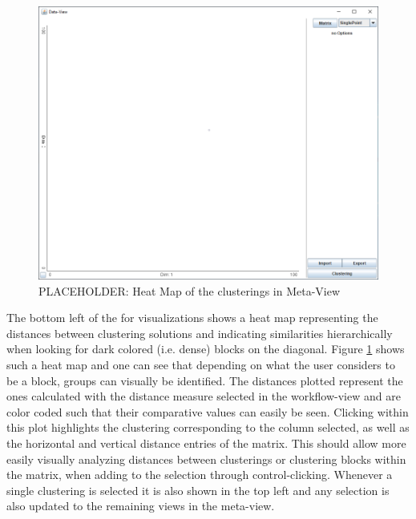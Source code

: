 \documentclass[
	a4paper,
	english,
	twoside,
	openright,               
	11pt                            
	]{report}
\begin{document}
\begin{figure}[h]
	\centering
	\includegraphics[scale=.45]{data-view}
	\caption{PLACEHOLDER: Heat Map of the clusterings in Meta-View}
	\label{fig:heatmap}
\end{figure}

The bottom left of the for visualizations shows a heat map representing the distances between clustering solutions and indicating similarities hierarchically when looking for dark colored (i.e. dense) blocks on the diagonal. Figure \ref{fig:heatmap} shows such a heat map and one can see that depending on what the user considers to be a block, groups can visually be identified. The distances plotted represent the ones calculated with the distance measure selected in the workflow-view and are color coded such that their comparative values can easily be seen. Clicking within this plot highlights the clustering corresponding to the column selected, as well as the horizontal and vertical distance entries of the matrix. This should allow more easily visually analyzing distances between clusterings or clustering blocks within the matrix, when adding to the selection through control-clicking. Whenever a single clustering is selected it is also shown in the top left and any selection is also updated to the remaining views in the meta-view.
\end{document}
